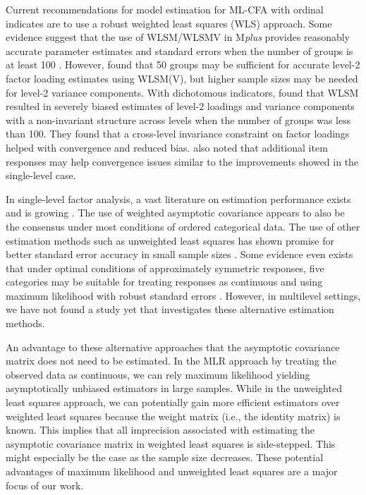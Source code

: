 \documentclass[Review,sageh,times, doublespace]{sagej}
\begin{document}
Current recommendations for model estimation for ML-CFA with ordinal indicates are to use a robust weighted least squares (WLS) approach\citep{Hox2010, Hsu2009, Asparouhov2007}.
Some evidence suggest that the use of WLSM/WLSMV in M\textit{plus} provides reasonably accurate parameter estimates and standard errors when the number of groups is at least 100 \citep{Hsu2009}.
However, \cite{Hox2010} found that 50 groups may be sufficient for accurate level-2 factor loading estimates using WLSM(V), but higher sample sizes may be needed for level-2 variance components.
With dichotomous indicators, \cite{Depaoli2015} found that WLSM resulted in severely biased estimates of level-2 loadings and variance components with a non-invariant structure across levels when the number of groups was less than 100. 
They found that a cross-level invariance constraint on factor loadings helped with convergence and reduced bias.
\cite{Depaoli2015} also noted that additional item responses may help convergence issues similar to the improvements \cite{Yang2010} showed in the single-level case.

In single-level factor analysis, a vast literature on estimation performance exists and is growing \citep{Li2016, Bandalos2014, DiStefano2014,  Yang2010, Forero2009, Flora2004, Dolan1994, Babakus1987}.
The use of weighted asymptotic covariance appears to also be the consensus under most conditions of ordered categorical data.
The use of other estimation methods such as unweighted least squares has shown promise for better standard error accuracy in small sample sizes \citep{Forero2009, Paek2018}.
Some evidence even exists that under optimal conditions of approximately symmetric responses, five categories may be suitable for treating responses as continuous and using maximum likelihood with robust standard errors \citep[MLR; ][]{Rhemtulla2012}.
However, in multilevel settings, we have not found a study yet that investigates these alternative estimation methods.

An advantage to these alternative approaches that the asymptotic covariance matrix does not need to be estimated.
In the MLR approach by treating the observed data as continuous, we can rely maximum likelihood yielding asymptotically unbiased estimators in large samples.
While in the unweighted least squares approach, we can potentially gain more efficient estimators over weighted least squares because the weight matrix (i.e., the identity matrix) is known.
This implies that all imprecision associated with estimating the asymptotic covariance matrix in weighted least squares is side-stepped.
This might especially be the case as the sample size decreases.
These potential advantages of maximum likelihood and unweighted least squares are a major focus of our work.
\end{document}
